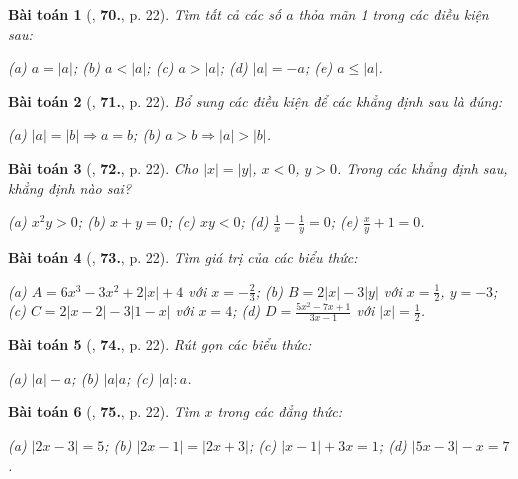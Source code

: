 \documentclass{article}
\newtheorem{baitoan}{Bài toán}
\begin{document}
\begin{baitoan}[\cite{Binh_Toan_7_tap_1}, \textbf{70.}, p. 22]
	Tìm tất cả các số $a$ thỏa mãn 1 trong các điều kiện sau:
	
		(a) $a = |a|$;
		(b) $a < |a|$;
		(c) $a > |a|$;
		(d) $|a| = -a$;
		(e) $a\le|a|$.
	
\end{baitoan}

\begin{baitoan}[\cite{Binh_Toan_7_tap_1}, \textbf{71.}, p. 22]
	Bổ sung các điều kiện để các khẳng định sau là đúng:
	
		(a) $|a| = |b|\Rightarrow a = b$;
		(b) $a > b\Rightarrow|a| > |b|$.
	
\end{baitoan}

\begin{baitoan}[\cite{Binh_Toan_7_tap_1}, \textbf{72.}, p. 22]
	Cho $|x| = |y|$, $x < 0$, $y > 0$. Trong các khẳng định sau, khẳng định nào sai?
	
		(a) $x^2y > 0$;
		(b) $x + y = 0$;
		(c) $xy < 0$;
		(d) $\frac{1}{x} - \frac{1}{y} = 0$;
		(e) $\frac{x}{y} + 1 = 0$.
	
\end{baitoan}

\begin{baitoan}[\cite{Binh_Toan_7_tap_1}, \textbf{73.}, p. 22]
	Tìm giá trị của các biểu thức:
	
		(a) $A = 6x^3 - 3x^2 + 2|x| + 4$ với $x = -\frac{2}{3}$;
		(b) $B = 2|x| - 3|y|$ với $x = \frac{1}{2}$, $y = -3$;
		(c) $C = 2|x - 2| - 3|1 - x|$ với $x = 4$;
		(d) $D = \frac{5x^2 - 7x + 1}{3x - 1}$ với $|x| = \frac{1}{2}$.
	
\end{baitoan}

\begin{baitoan}[\cite{Binh_Toan_7_tap_1}, \textbf{74.}, p. 22]
	Rút gọn các biểu thức:
	
		(a) $|a| - a$;
		(b) $|a|a$;
		(c) $|a|:a$.
	
\end{baitoan}

\begin{baitoan}[\cite{Binh_Toan_7_tap_1}, \textbf{75.}, p. 22]
	Tìm $x$ trong các đẳng thức:
	
		(a) $|2x - 3| = 5$;
		(b) $|2x - 1| = |2x + 3|$;
		(c) $|x - 1| + 3x = 1$;
		(d) $|5x - 3| - x = 7$.
	
\end{baitoan}
\end{document}
